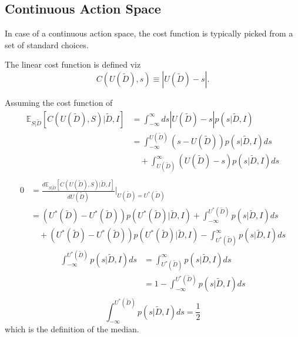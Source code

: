 \subsection{Continuous Action Space}
In case of a continuous action space, the cost function is typically picked from a set of standard choices.	
\begin{definition}
	\label{def:linear_cost_function}
	The linear cost function is defined viz
	\begin{equation}
		C(U(\tilde{D}),s) \equiv |U(\tilde{D})-s|.
	\end{equation}
	
\end{definition}
\begin{theorem}
	Assuming the cost function of 
	\begin{equation}
		\begin{split}
			\mathbb{E}_{S|\tilde{D}}[C(U(\tilde{D}), S)|\tilde{D},I] &= \int_{-\infty}^{\infty} ds |U(\tilde{D})-s| p(s|\tilde{D},I)\\
			&= \int_{-\infty}^{U(\tilde{D})} (s-U(\tilde{D}))p(s|\tilde{D},I)ds\\
			&\quad+\int_{U(\tilde{D})}^\infty (U(\tilde{D})-s)p(s|\tilde{D},I)ds\\
		\end{split}
	\end{equation}
	\begin{equation}
		\begin{split}
			0 &=\frac{d \mathbb{E}_{S|\tilde{D}}[C(U(\tilde{D}), S)|\tilde{D},I]}{dU(\tilde{D})}\bigg|_{U(\tilde{D})=U^*(\tilde{D})}\\
			&= (U^*(\tilde{D})-U^*(\tilde{D}))p(U^*(\tilde{D})|\tilde{D},I)+\int_{-\infty}^{U^*(\tilde{D})} p(s|\tilde{D},I)ds\\
			&\quad+(U^*(\tilde{D})-U^*(\tilde{D}))p(U^*(\tilde{D})|\tilde{D},I)-\int_{U^*(\tilde{D})}^\infty p(s|\tilde{D},I)ds
		\end{split}
	\end{equation}
	\begin{equation}
		\begin{split}
			\int_{-\infty}^{U^*(\tilde{D})} p(s|\tilde{D},I)ds &= \int_{U^*(\tilde{D})}^\infty p(s|\tilde{D},I)ds\\
			&= 1- \int_{-\infty}^{U^*(\tilde{D})} p(s|\tilde{D},I)ds\\
		\end{split}
	\end{equation}
	\begin{equation}
		\int_{-\infty}^{U^*(\tilde{D})} p(s|\tilde{D},I)ds = \frac{1}{2}
	\end{equation}
	which is the definition of the median.
\end{theorem}

